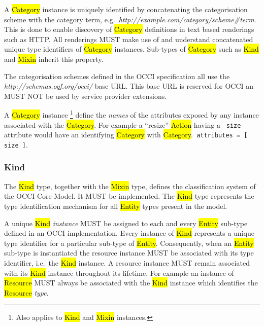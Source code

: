\documentclass[10pt,a4paper]{article}
\begin{document}

A \hl{Category} instance is uniquely identified by concatenating the
categorisation scheme with the category term,
e.g.~\textit{http://example.com/category/scheme\#term}.
This is done to enable discovery of \hl{Category} definitions in text based
renderings such as HTTP. All renderings MUST make use of and understand
concatenated unique type identifiers of \hl{Category} instances.
%
Sub-types of \hl{Category} such as \hl{Kind} and \hl{Mixin} inherit this property.

The categorisation schemes defined in the OCCI specification all use the
\textit{http://schemas.ogf.org/occi/} base URL. This base URL is reserved for
OCCI an MUST NOT be used by service provider extensions.

A \hl{Category} instance%
\footnote{Also applies to \hl{Kind} and \hl{Mixin} instances.}
define the {\em names} of the attributes exposed by any instance associated
with the \hl{Category}.  For example a ``resize'' \hl{Action} having a {\tt
size} attribute would have an identifying \hl{Category} with \hl{Category}.{\tt
attributes = [ size ]}.

\subsubsection{Kind}
\label{sec:kind}

The \hl{Kind} type, together with the \hl{Mixin} type, defines the
classification system of the OCCI Core Model. It MUST be implemented. The \hl{Kind}
type represents the type identification mechanism for all \hl{Entity} types present in
the model.

A unique \hl{Kind} {\em instance} MUST be assigned to each and every
\hl{Entity} sub-type defined in an OCCI implementation.
%
Every instance of \hl{Kind} represents a unique type identifier for a
particular sub-type of \hl{Entity}.  Consequently, when an \hl{Entity} sub-type
is instantiated the resource instance MUST be associated with its type
identifier, i.e.~the \hl{Kind} instance.  A resource instance MUST remain
associated with its \hl{Kind} instance throughout its lifetime.
%
For example an instance of \hl{Resource} MUST always be associated with the
\hl{Kind} instance which identifies the \hl{Resource} {\em type}.
\end{document}
